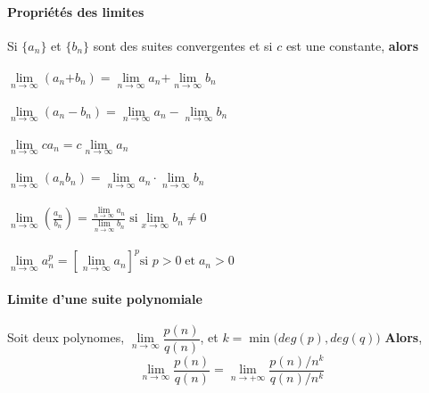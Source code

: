 \documentclass[2pt]{report}
\begin{document}
\begin{multicols*}{3}
    \paragraph{Propriétés des limites}
        Si $\{a_n\}$ et $\{b_n\}$ sont des suites convergentes et 
        si $c$ est une constante, \textbf{alors} \\\\ 
        $\lim\limits_{n\to\infty  }\left(a_n \text{+} b_n \right) = 
        \lim\limits_{n\to\infty  }a_n \text{+} 
        \lim\limits_{n\to\infty  }b_n$
        \\\\
        $\lim\limits_{n\to\infty  }\left(a_n - b_n \right) = 
        \lim\limits_{n\to\infty  }a_n - \lim\limits_{n\to\infty  }b_n$ 
        \\\\
        $\lim\limits_{n\to\infty  }ca_n = c \lim\limits_{n \to \infty  }a_n$ 
        \\\\
        $\lim\limits_{n\to\infty  }\left(a_nb_n \right) = 
        \lim\limits_{n\to\infty  }a_n \cdot \lim\limits_{n\to\infty  }b_n$
        \\\\
        $\lim\limits_{n\to\infty  }\left(\frac{a_n}{b_n} \right) = 
        \frac{\lim\limits_{n\to\infty  }a_n}{\lim\limits_{n\to\infty  }b_n}
        \;
        \text{si} \lim\limits_{x\to\infty  }b_n \neq 0$
        \\\\
        $\lim\limits_{n\to\infty  }a_n^{p} = 
        \left[\lim\limits_{n\to\infty  }a_n \right]^p \text{si } 
        p > 0 \; \text{et} \; a_n > 0$



    \paragraph{Limite d'une suite polynomiale} 
        Soit deux polynomes,
        $\lim\limits_{n\to \infty } \dfrac{p(n)}{q(n)}$, 
        et 
        $k = \min\bigl(deg(p), deg(q)\bigr)$
        \textbf{Alors},   
        \[ \lim\limits_{n\to \infty } \dfrac{p(n)}{q(n)} =
        \lim\limits_{n\to+\infty}\dfrac{p(n)/{n^k}}{q(n)/n^{k}} \]




\end{multicols*}
\end{document}
